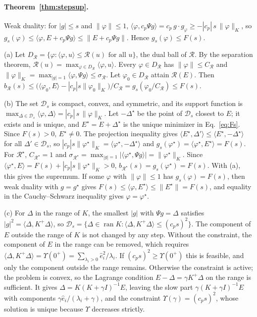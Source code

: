 \documentclass[11pt]{article}
\theoremstyle{definition}
\theoremstyle{remark}
\newcommand{\Rgh}{\mathcal{R}}           %
\newcommand{\sR}{\sigma_{\Rgh}}
\newcommand{\CR}{C_{\Rgh}}
\newcommand{\ip}[2]{\langle #1,#2\rangle}
\begin{document}
\paragraph{Theorem~\ref{thm:stepsup}.}
Weak duality: for $|g| \le s$ and $\|\varphi\| \le 1$, $\ip{\varphi}{c_p\Psi g} = c_p\,g\cdot g_\varphi \ge -|c_p|\,s\,\|\varphi\|_K$, so $g_s(\varphi) \le \ip{\varphi}{E + c_p\Psi g} \le \|E + c_p\Psi g\|$.
Hence $g_s(\varphi) \le F(s)$.

(a) Let $D_\Rgh = \{\varphi : \ip{\varphi}{u} \le \Rgh(u) \text{ for all } u\}$, the dual ball of $\Rgh$.
By the separation theorem, $\Rgh(u) = \max_{\varphi\in D_\Rgh}\ip{\varphi}{u}$.
Every $\varphi\in D_\Rgh$ has $\|\varphi\| \le \CR$ and $\|\varphi\|_K = \max_{|g|=1}\ip{\varphi}{\Psi g} \le \sR$.
Let $\varphi_0\in D_\Rgh$ attain $\Rgh(E)$.
Then $b_\Rgh(s) \le \big(\ip{\varphi_0}{E} - |c_p|s\|\varphi_0\|_K\big)/\CR = g_s(\varphi_0/\CR) \le F(s)$.

(b) The set $\mathcal{D}_s$ is compact, convex, and symmetric, and its support function is $\max_{\Delta\in\mathcal{D}_s}\ip{\varphi}{\Delta} = |c_p|\,s\,\|\varphi\|_K$.
Let $-\Delta^\star$ be the point of $\mathcal{D}_s$ closest to $E$; it exists and is unique, and $E^\star = E + \Delta^\star$ is the unique minimizer in Eq.~\eqref{eq:Fs}.
Since $F(s) > 0$, $E^\star \neq 0$.
The projection inequality gives $\ip{E^\star}{\Delta'} \le \ip{E^\star}{-\Delta^\star}$ for all $\Delta'\in\mathcal{D}_s$, so $|c_p|s\|\varphi^\star\|_K = \ip{\varphi^\star}{-\Delta^\star}$ and $g_s(\varphi^\star) = \ip{\varphi^\star}{E^\star} = F(s)$.
For $\Rgh^\star$, $C_{\Rgh^\star} = 1$ and $\sigma_{\Rgh^\star} = \max_{|g|=1}|\ip{\varphi^\star}{\Psi g}| = \|\varphi^\star\|_K$.
Since $\ip{\varphi^\star}{E} = F(s) + |c_p|s\|\varphi^\star\|_K > 0$, $b_{\Rgh^\star}(s) = g_s(\varphi^\star) = F(s)$.
With (a), this gives the supremum.
If some $\varphi$ with $\|\varphi\|\le1$ has $g_s(\varphi) = F(s)$, then weak duality with $g = g^\star$ gives $F(s) \le \ip{\varphi}{E^\star} \le \|E^\star\| = F(s)$, and equality in the Cauchy--Schwarz inequality gives $\varphi = \varphi^\star$.

(c) For $\Delta$ in the range of $K$, the smallest $|g|$ with $\Psi g = \Delta$ satisfies $|g|^2 = \ip{\Delta}{K^{+}\Delta}$, so $\mathcal{D}_s = \{\Delta \in \operatorname{ran}K : \ip{\Delta}{K^{+}\Delta} \le (c_ps)^2\}$.
The component of $E$ outside the range of $K$ is not changed by any step.
Without the constraint, the component of $E$ in the range can be removed, which requires $\ip{\Delta}{K^{+}\Delta} = \Upsilon(0^+) = \sum_{\lambda_i>0}\hat e_i^2/\lambda_i$.
If $(c_ps)^2 \ge \Upsilon(0^+)$ this is feasible, and only the component outside the range remains.
Otherwise the constraint is active; the problem is convex, so the Lagrange condition $E - \Delta = \gamma K^{+}\Delta$ on the range is sufficient.
It gives $\Delta = K(K+\gamma I)^{-1}E$, leaving the slow part $\gamma(K+\gamma I)^{-1}E$ with components $\gamma\hat e_i/(\lambda_i+\gamma)$, and the constraint $\Upsilon(\gamma) = (c_ps)^2$, whose solution is unique because $\Upsilon$ decreases strictly.
\end{document}
